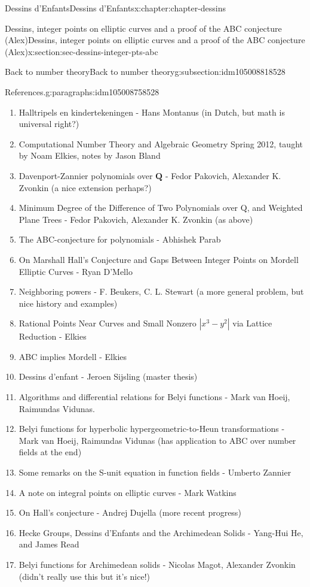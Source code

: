 \documentclass[oneside,10pt,]{book}
\numberwithin{equation}{section}
\newcommand{\QQ}{\mathbf{Q}}
\begin{document}
\begin{chapterptx}{Dessins d'Enfants}{}{Dessins d'Enfants}{}{}{x:chapter:chapter-dessins}
\begin{sectionptx}{Dessins, integer points on elliptic curves and a proof of the ABC conjecture (Alex)}{}{Dessins, integer points on elliptic curves and a proof of the ABC conjecture (Alex)}{}{}{x:section:sec-dessins-integer-pts-abc}
\begin{subsectionptx}{Back to number theory}{}{Back to number theory}{}{}{g:subsection:idm105008818528}
\begin{paragraphs}{References.}{g:paragraphs:idm105008758528}
\begin{enumerate}
\item{}Halltripels en kindertekeningen - Hans Montanus (in Dutch, but math is universal right?)%
\item{}Computational Number Theory and Algebraic Geometry Spring 2012, taught by Noam Elkies, notes by Jason Bland%
\item{}Davenport-Zannier polynomials over \(\QQ\) - Fedor Pakovich, Alexander K. Zvonkin (a nice extension perhaps?)%
\item{}Minimum Degree of the Difference of Two Polynomials over Q, and Weighted Plane Trees -  Fedor Pakovich,  Alexander K. Zvonkin (as above)%
\item{}The ABC-conjecture for polynomials - Abhishek Parab%
\item{}On Marshall Hall's Conjecture and Gaps Between Integer Points on Mordell Elliptic Curves - Ryan D'Mello%
\item{}Neighboring powers - F. Beukers, C. L. Stewart (a more general problem, but nice history and examples)%
\item{}Rational Points Near Curves and Small Nonzero \(| x^3 - y^2|\) via Lattice Reduction - Elkies%
\item{}ABC implies Mordell - Elkies%
\item{}Dessins d'enfant -  Jeroen Sijsling (master thesis)%
\item{}Algorithms and differential relations for Belyi functions - Mark van Hoeij, Raimundas Vidunas.%
\item{}Belyi functions for hyperbolic hypergeometric-to-Heun transformations -  Mark van Hoeij, Raimundas Vidunas (has application to ABC over number fields at the end)%
\item{}Some remarks on the S-unit equation in function fields  - Umberto Zannier%
\item{}A note on integral points on elliptic curves - Mark Watkins%
\item{}On Hall’s conjecture - Andrej Dujella (more recent progress)%
\item{}Hecke Groups, Dessins d'Enfants and the Archimedean Solids -  Yang-Hui He, and James Read%
\item{}Belyi functions for Archimedean solids - Nicolas Magot, Alexander Zvonkin (didn't really use this but it's nice!)%
\end{enumerate}
%
\end{paragraphs}%
\end{subsectionptx}
\end{sectionptx}
%
%
\typeout{************************************************}

\end{chapterptx}
\end{document}

